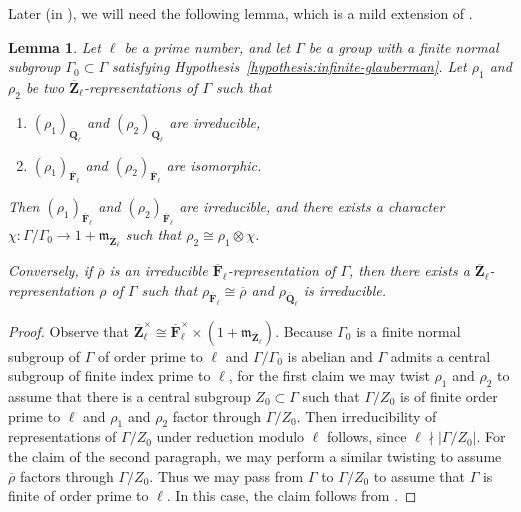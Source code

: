 \documentclass[reqno]{amsart}
\numberwithin{equation}{subsection}
\newcommand{\F}{\mathbf{F}}
\newcommand{\Q}{\mathbf{Q}}
\newcommand{\Z}{\mathbf{Z}}
\newcommand{\ol}[1]{\overline{#1}}
\newcommand{\co}{\colon}
\newcommand\fm{\mathfrak{m}}
\newtheorem{lemma}[thm]{Lemma}
\theoremstyle{remark}
\numberwithin{equation}{subsection}
\numberwithin{figure}{subsection}
\begin{document}
Later (in \cite{CF26a}), we will need the following lemma, which is a mild extension of \cite[Part~III, no.\ 15.5, Proposition~43]{Serre77}.

\begin{lemma}\label{lemma:infinite-glauberman-modular-reduction}
    Let $\ell$ be a prime number, and let $\Gamma$ be a group with a finite normal subgroup $\Gamma_0 \subset \Gamma$ satisfying Hypothesis~\ref{hypothesis:infinite-glauberman}. Let $\rho_1$ and $\rho_2$ be two $\ol\Z_\ell$-representations of $\Gamma$ such that
    \begin{enumerate}
        \item $(\rho_1)_{\ol\Q_\ell}$ and $(\rho_2)_{\ol\Q_\ell}$ are irreducible,
        \item $(\rho_1)_{\ol\F_\ell}$ and $(\rho_2)_{\ol\F_\ell}$ are isomorphic.
    \end{enumerate}
    Then $(\rho_1)_{\ol\F_\ell}$ and $(\rho_2)_{\ol\F_\ell}$ are irreducible, and there exists a character $\chi\co \Gamma/\Gamma_0 \to 1 + \fm_{\ol\Z_\ell}$ such that $\rho_2 \cong \rho_1 \otimes \chi$.
    
    Conversely, if $\ol\rho$ is an irreducible $\ol\F_\ell$-representation of $\Gamma$, then there exists a $\ol\Z_\ell$-representation $\rho$ of $\Gamma$ such that $\rho_{\ol\F_\ell} \cong \ol\rho$ and $\rho_{\ol\Q_\ell}$ is irreducible.
\end{lemma}

\begin{proof}
    Observe that $\ol\Z_\ell^\times \cong \ol\F_\ell^\times \times (1 + \fm_{\ol\Z_\ell})$. Because $\Gamma_0$ is a finite normal subgroup of $\Gamma$ of order prime to $\ell$ and $\Gamma/\Gamma_0$ is abelian and $\Gamma$ admits a central subgroup of finite index prime to $\ell$, for the first claim we may twist $\rho_1$ and $\rho_2$ to assume that there is a central subgroup $Z_0 \subset \Gamma$ such that $\Gamma/Z_0$ is of finite order prime to $\ell$ and $\rho_1$ and $\rho_2$ factor through $\Gamma/Z_0$. Then irreducibility of representations of $\Gamma/Z_0$ under reduction modulo $\ell$ follows, since $\ell \nmid |\Gamma/Z_0|$. For the claim of the second paragraph, we may perform a similar twisting to assume $\ol\rho$ factors through $\Gamma/Z_0$. Thus we may pass from $\Gamma$ to $\Gamma/Z_0$ to assume that $\Gamma$ is finite of order prime to $\ell$. In this case, the claim follows from \cite[Part~III, no.\ 15.5, Proposition~43]{Serre77}.
\end{proof}
\end{document}
